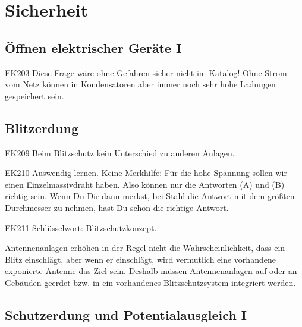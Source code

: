 \setcounter{section}{15}
\section{Sicherheit}

\subsection{Öffnen elektrischer Geräte I}


\begin{sol}{EK203}
  Diese Frage wäre ohne Gefahren sicher nicht im Katalog!
  Ohne Strom vom Netz können in Kondensatoren aber immer noch sehr hohe Ladungen gespeichert sein.   
\end{sol}

\begin{ohmchapter}
\end{ohmchapter}

\subsection{Blitzerdung}


\begin{sol}{EK209}
Beim Blitzschutz kein Unterschied zu anderen Anlagen.
\end{sol}


\begin{sol}{EK210}
Auswendig lernen. Keine Merkhilfe: Für die hohe Spannung sollen wir einen Einzelmassivdraht haben. Also können nur die Antworten (A) und (B) richtig sein.
Wenn Du Dir dann merkst, bei Stahl die Antwort mit dem größten Durchmesser zu nehmen, hast Du schon die richtige Antwort.

\end{sol}

\begin{sol}{EK211}
Schlüsselwort: Blitzschutzkonzept.
\end{sol}

\begin{ohmchapter}
Antennenanlagen erhöhen in der Regel nicht die Wahrscheinlichkeit, dass ein Blitz einschlägt, aber wenn er einschlägt, wird vermutlich eine vorhandene exponierte Antenne das Ziel sein.
Deshalb müssen Antennenanlagen auf oder an Gebäuden geerdet bzw. in ein vorhandenes Blitzschutzsystem integriert werden. 
\end{ohmchapter}

\subsection{Schutzerdung und Potentialausgleich I}


